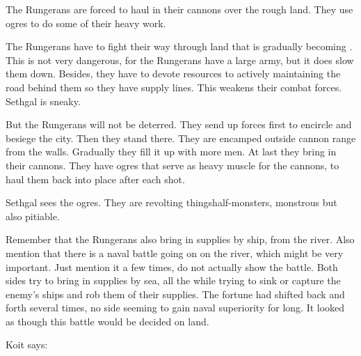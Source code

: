 \begin{changes}
    The Rungerans are forced to haul in their cannons over the rough land. 
    They use \nephil ogres to do some of their heavy work.

    The Rungerans have to fight their way through land that is gradually becoming \wylde. 
    This is not very dangerous, for the Rungerans have a large army, but it does slow them down.
    Besides, they have to devote resources to actively maintaining the road behind them so they have supply lines. 
    This weakens their combat forces. 
    Sethgal is sneaky. 

    But the Rungerans will not be deterred. 
    They send up forces first to encircle and besiege the city.
    Then they stand there. 
    They are encamped outside cannon range from the walls. 
    Gradually they fill it up with more men. 
    At last they bring in their cannons. 
    They have ogres that serve as heavy muscle for the cannons, to haul them back into place after each shot. 
    
    Sethgal sees the ogres. 
    They are revolting things\dash half-\human monsters, monstrous but also pitiable. 
    
    Remember that the Rungerans also bring in supplies by ship, from the river. 
    Also mention that there is a naval battle going on on the river, which might be very important. 
    Just mention it a few times, do not actually show the battle.
    Both sides try to bring in supplies by sea, all the while trying to sink or capture the enemy's ships and rob them of their supplies. 
    The fortune had shifted back and forth several times, no side seeming to gain naval superiority for long.
    It looked as though this battle would be decided on land. 
    
    
  \begin{comment}
    \paragraph{The Cannonade}
  \end{comment}
    Koit says: 
\end{changes}
